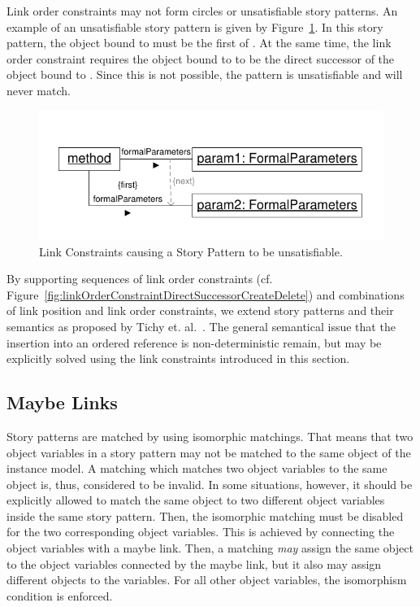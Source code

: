 {Link order constraints may not form circles or unsatisfiable story patterns. An example of an unsatisfiable story pattern is given by Figure~\ref{fig:linkConstraintUnsatisfiablePattern}. In this story pattern, the object bound to  must be the first  of . At the same time, the link order constraint requires the object bound to  to be the direct successor of the object bound to . Since this is not possible, the pattern is unsatisfiable and will never match.


\begin{figure}[htbp]
\center
\includegraphics[width=0.75\columnwidth]{figures/LinkConstraintUnsatisfiablePattern}
\caption{Link Constraints causing a Story Pattern to be unsatisfiable.}
\label{fig:linkConstraintUnsatisfiablePattern}
\end{figure}

By supporting sequences of link order constraints (cf. Figure~\ref{fig:linkOrderConstraintDirectSuccessorCreateDelete}) and combinations of link position and link order constraints, we extend story patterns and their semantics as proposed by Tichy et. al.~\cite{TMG06}. The general semantical issue that the insertion into an ordered reference is non-deterministic remain, but may be explicitly solved using the link constraints introduced in this section. 

} %

\subsection{Maybe Links}
\label{sec:StoryPatterns:specialLinks:maybeLink}

Story patterns are matched by using isomorphic matchings. 
That means that two object variables in a story pattern may not be matched to the same object of the instance model. 
A matching which matches two object variables to the same object is, thus, considered to be invalid. 
In some situations, however, it should be explicitly allowed to match the same object to two different object variables inside the same story pattern. 
Then, the isomorphic matching must be disabled for the two corresponding object variables. 
This is achieved by connecting the object variables with a maybe link. 
Then, a matching \emph{may} assign the same object to the object variables connected by the maybe link, but it also may assign different objects to the variables.
For all other object variables, the isomorphism condition is enforced.


